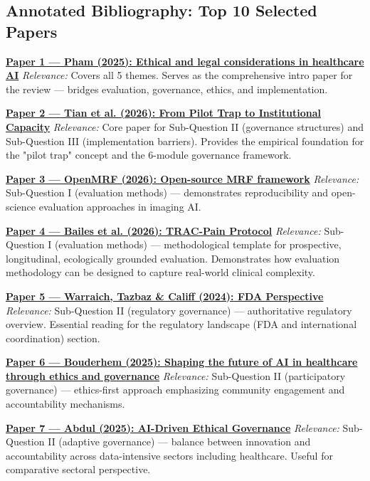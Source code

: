 \subsection{Annotated Bibliography: Top 10 Selected Papers}
\label{sec:annotated_bib}


\medskip
\noindent\textbf{\underline{Paper 1 — Pham (2025): Ethical and legal considerations in healthcare AI}}
\textit{Relevance:} Covers all 5 themes. Serves as the comprehensive intro
paper for the review — bridges evaluation, governance, ethics, and implementation.

\medskip
\noindent\textbf{\underline{Paper 2 — Tian et al. (2026): From Pilot Trap to Institutional Capacity}}
\textit{Relevance:} Core paper for Sub-Question II (governance structures) and
Sub-Question III (implementation barriers). Provides the empirical foundation
for the "pilot trap" concept and the 6-module governance framework.

\medskip
\noindent\textbf{\underline{Paper 3 — OpenMRF (2026): Open-source MRF framework}}
\textit{Relevance:} Sub-Question I (evaluation methods) — demonstrates
reproducibility and open-science evaluation approaches in imaging AI.

\medskip
\noindent\textbf{\underline{Paper 4 — Bailes et al. (2026): TRAC-Pain Protocol}}
\textit{Relevance:} Sub-Question I (evaluation methods) — methodological
template for prospective, longitudinal, ecologically grounded evaluation.
Demonstrates how evaluation methodology can be designed to capture
real-world clinical complexity.

\medskip
\noindent\textbf{\underline{Paper 5 — Warraich, Tazbaz \& Califf (2024): FDA Perspective}}
\textit{Relevance:} Sub-Question II (regulatory governance) — authoritative
regulatory overview. Essential reading for the regulatory landscape
(FDA and international coordination) section.

\medskip
\noindent\textbf{\underline{Paper 6 — Bouderhem (2025): Shaping the future of AI in healthcare through ethics and governance}}
\textit{Relevance:} Sub-Question II (participatory governance) — ethics-first
approach emphasizing community engagement and accountability mechanisms.

\medskip
\noindent\textbf{\underline{Paper 7 — Abdul (2025): AI-Driven Ethical Governance}}
\textit{Relevance:} Sub-Question II (adaptive governance) — balance between
innovation and accountability across data-intensive sectors including healthcare.
Useful for comparative sectoral perspective.

